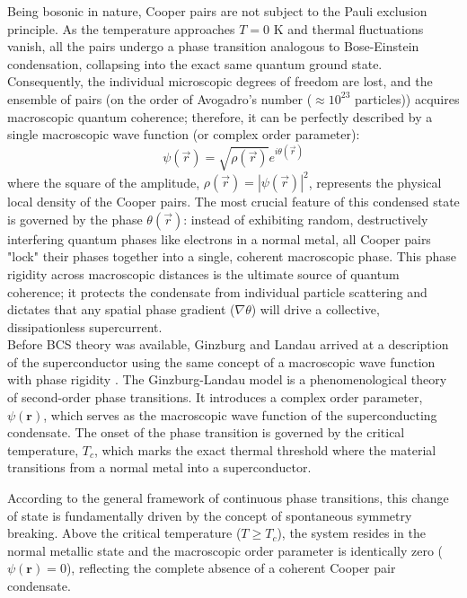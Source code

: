 \documentclass[english,binding=0.6cm,noexaminfo]{sapthesis}
\begin{document}
Being bosonic in nature, Cooper pairs are not subject to the Pauli exclusion principle. As the temperature approaches $T=0$ K and thermal fluctuations vanish, all the pairs undergo a phase transition analogous to Bose-Einstein condensation, collapsing into the exact same quantum ground state. Consequently, the individual microscopic degrees of freedom are lost, and the ensemble of pairs (on the order of Avogadro's number ($\approx 10^{23}$ particles)) acquires macroscopic quantum coherence; therefore, it can be perfectly described by a single macroscopic wave function (or complex order parameter):
\begin{equation}
    \psi(\vec{r}) = \sqrt{\rho(\vec{r})} e^{i\theta(\vec{r})}
\end{equation}
where the square of the amplitude, $\rho(\vec{r}) = |\psi(\vec{r})|^2$, represents the physical local density of the Cooper pairs. The most crucial feature of this condensed state is governed by the phase $\theta(\vec{r})$: instead of exhibiting random, destructively interfering quantum phases like electrons in a normal metal, all Cooper pairs "lock" their phases together into a single, coherent macroscopic phase. This phase rigidity across macroscopic distances is the ultimate source of quantum coherence; it protects the condensate from individual particle scattering and dictates that any spatial phase gradient ($\nabla\theta$) will drive a collective, dissipationless supercurrent.\\

Before BCS theory was available,
Ginzburg and Landau arrived at a description of the superconductor using the same concept of a macroscopic wave function with phase rigidity \cite{ginzburg1965theory}. The Ginzburg-Landau model is a phenomenological theory of second-order phase transitions. It introduces a complex order parameter, $\psi(\mathbf{r})$, which serves as the macroscopic wave function of the superconducting condensate. The onset of the phase transition is governed by the critical temperature, $T_c$, which marks the exact thermal threshold where the material transitions from a normal metal into a superconductor.

According to the general framework of continuous phase transitions, this change of state is fundamentally driven by the concept of spontaneous symmetry breaking. Above the critical temperature ($T \ge T_c$), the system resides in the normal metallic state and the macroscopic order parameter is identically zero ($\psi(\mathbf{r}) = 0$), reflecting the complete absence of a coherent Cooper pair condensate.
\end{document}
